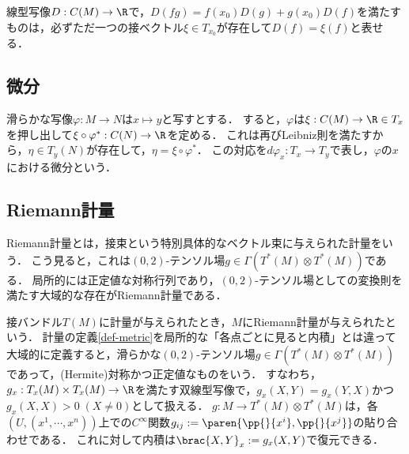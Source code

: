 \documentclass[uplatex,dvipdfmx]{jsreport}
\begin{document}
\begin{theorem}
    線型写像$D:C(M)\to\R$で，$D(fg)=f(x_0)D(g)+g(x_0)D(f)$を満たすものは，必ずただ一つの接ベクトル$\xi\in T_{x_0}$が存在して$D(f)=\xi(f)$と表せる．
\end{theorem}

\subsection{微分}

\begin{definition}
    滑らかな写像$\varphi:M\to N$は$x\mapsto y$と写すとする．
    すると，$\varphi$は$\xi:C(M)\to\R\in T_x$を押し出して$\xi\circ\varphi^*:C(N)\to\R$を定める．
    これは再びLeibniz則を満たすから，$\eta\in T_y(N)$が存在して，$\eta=\xi\circ\varphi^*$．
    この対応を$d\varphi_x:T_x\to T_y$で表し，$\varphi$の$x$における微分という．
\end{definition}

\subsection{Riemann計量}

\begin{tcolorbox}[colframe=ForestGreen, colback=ForestGreen!10!white,breakable,colbacktitle=ForestGreen!40!white,coltitle=black,fonttitle=\bfseries\sffamily,
    title=]
    Riemann計量とは，接束という特別具体的なベクトル束に与えられた計量をいう．
    こう見ると，これは$(0,2)$-テンソル場$g\in\Gamma(T^*(M)\otimes T^*(M))$である．
    局所的には正定値な対称行列であり，$(0,2)$-テンソル場としての変換則を満たす大域的な存在がRiemann計量である．
\end{tcolorbox}

\begin{remarks}
    接バンドル$T(M)$に計量が与えられたとき，$M$にRiemann計量が与えられたという．
    計量の定義\ref{def-metric}を局所的な「各点ごとに見ると内積」とは違って大域的に定義すると，滑らかな$(0,2)$-テンソル場$g\in\Gamma(T^*(M)\otimes T^*(M))$であって，(Hermite)対称かつ正定値なものをいう．
    すなわち，$g_x:T_x(M)\times T_x(M)\to\R$を満たす双線型写像で，$g_x(X,Y)=g_x(Y,X)$かつ$g_x(X,X)>0\;(X\ne 0)$として扱える．
    $g:M\to T^*(M)\otimes T^*(M)$は，各$(U,(x^1,\cdots,x^n))$上での$C^\infty$関数$g_{ij}:=\paren{\pp{}{x^i},\pp{}{x^j}}$の貼り合わせである．
    これに対して内積は$\brac{X,Y}_x:=g_x(X,Y)$で復元できる．
\end{remarks}
\end{document}

